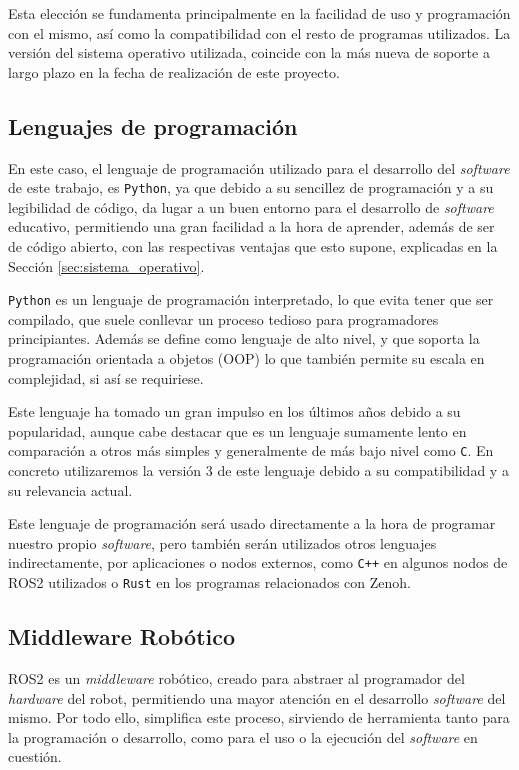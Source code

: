 Esta elección se fundamenta principalmente en la facilidad de uso y programación
con el mismo, así como la compatibilidad con el resto de programas utilizados.
La versión del sistema operativo utilizada, coincide con la más nueva de soporte
a largo plazo en la fecha de realización de este proyecto.


\subsection{Lenguajes de programación}
\label{sec:lenguaje_programacion}

En este caso, el lenguaje de programación utilizado para el desarrollo del
\textit{software} de este trabajo, es \texttt{Python}, ya que debido a su
sencillez de programación y a su legibilidad de código, da lugar a un buen
entorno para el desarrollo de \textit{software} educativo, permitiendo una gran
facilidad a la hora de aprender, además de ser de código abierto, con las
respectivas ventajas que esto supone, explicadas en la Sección
\ref{sec:sistema_operativo}.

\texttt{Python} es un lenguaje de programación interpretado, lo que evita tener
que ser compilado, que suele conllevar un proceso tedioso para programadores
principiantes.
Además se define como lenguaje de alto nivel, y que soporta la programación
orientada a objetos (OOP) lo que también permite su escala en complejidad, si
así se requiriese.

Este lenguaje ha tomado un gran impulso en los últimos años debido a su
popularidad, aunque cabe destacar que es un lenguaje sumamente lento en
comparación a otros más simples y generalmente de más bajo nivel como
\texttt{C}.
En concreto utilizaremos la versión 3 de este lenguaje debido a su
compatibilidad y a su relevancia actual.

Este lenguaje de programación será usado directamente a la hora de programar
nuestro propio \textit{software}, pero también serán utilizados otros lenguajes
indirectamente, por aplicaciones o nodos externos, como \texttt{C++} en algunos
nodos de ROS2 utilizados o \texttt{Rust} en los programas relacionados con
Zenoh.


\subsection{Middleware Robótico}
\label{sec:middleware_robotico}

ROS2 es un \textit{middleware} robótico, creado para abstraer al programador del
\textit{hardware} del robot, permitiendo una mayor atención en el desarrollo
\textit{software} del mismo.
Por todo ello, simplifica este proceso, sirviendo de herramienta tanto para la
programación o desarrollo, como para el uso o la ejecución del \textit{software}
en cuestión.

